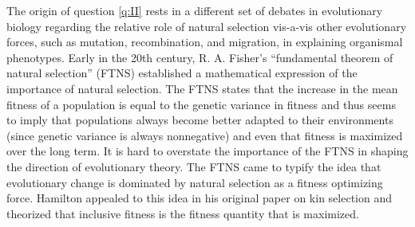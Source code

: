 \documentclass[11pt]{article}
\begin{document}
The origin of question \ref{q:II} rests in a different set of debates in evolutionary biology regarding the relative role of natural selection vis-a-vis other evolutionary forces, such as mutation, recombination, and migration, in explaining organismal phenotypes. Early in the 20th century, R. A. Fisher's ``fundamental theorem of natural selection'' (FTNS) \cite{Fisher:1930} established a mathematical expression of the importance of natural selection. The FTNS states that the increase in the mean fitness of a population is equal to the genetic variance in fitness and thus seems to imply that populations always become better adapted to their environments (since genetic variance is always nonnegative) and even that fitness is maximized over the long term. It is hard to overstate the importance of the FTNS in shaping the direction of evolutionary theory. The FTNS came to typify the idea that evolutionary change is dominated by natural selection as a fitness optimizing force. Hamilton appealed to this idea in his original paper on kin selection \cite{Hamilton:1964} and theorized that inclusive fitness is the fitness quantity that is maximized.
\end{document}
